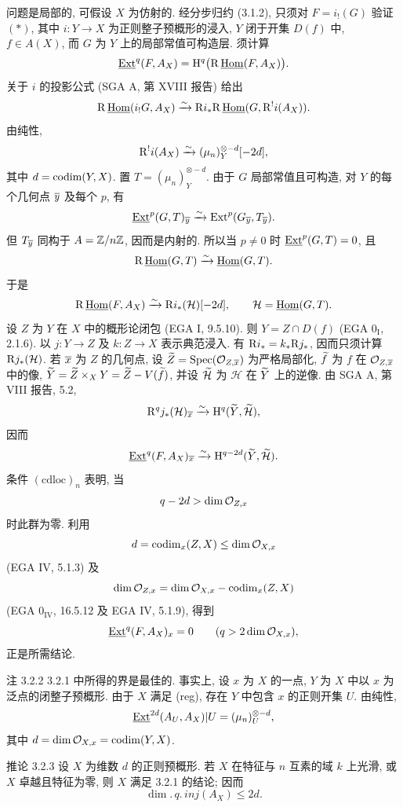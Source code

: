 \begin{prooftext}
问题是局部的, 可假设 $X$ 为仿射的. 经分步归约 (3.1.2), 只须对 $F=i_!(G)$ 验证 $(*)$, 其中 $i:Y\to X$ 为正则整子预概形的浸入, $Y$ 闭于开集 $D(f)$ 中, $f\in A(X)$, 而 $G$ 为 $Y$ 上的局部常值可构造层. 须计算
\[
   \underline{\operatorname{Ext}}^q(F,A_X)=\mathrm{H}^q\bigl(\mathrm R\,\underline{\operatorname{Hom}}(F,A_X)\bigr).
\]
关于 $i$ 的投影公式 (SGA A, 第 XVIII 报告) 给出
\[
 \mathrm R\,\underline{\operatorname{Hom}}(i_!G,A_X)
   \xrightarrow{\sim}
 \mathrm R i_*\mathrm R\,\underline{\operatorname{Hom}}(G,\mathrm R^!i(A_X)).
\]
由纯性,
\[
   \mathrm R^!i(A_X)\xrightarrow{\sim}(\mu_n)^{\otimes -d}_Y[-2d],
\]
其中 $d=\operatorname{codim}(Y,X)$. 置 $T=(\mu_n)^{\otimes -d}_Y$. 由于 $G$ 局部常值且可构造, 对 $Y$ 的每个几何点 $\overline{y}$ 及每个 $p$, 有
\[
   \underline{\operatorname{Ext}}^p(G,T)_{\overline{y}}\xrightarrow{\sim}\operatorname{Ext}^p(G_{\overline{y}},T_{\overline{y}}).
\]
但 $T_{\overline{y}}$ 同构于 $A=\mathbb{Z}/n\mathbb{Z}$, 因而是内射的. 所以当 $p\ne0$ 时 $\underline{\operatorname{Ext}}^p(G,T)=0$, 且
\[
   \mathrm R\,\underline{\operatorname{Hom}}(G,T)\xrightarrow{\sim}\underline{\operatorname{Hom}}(G,T).
\]
于是
\[
   \mathrm R\,\underline{\operatorname{Hom}}(F,A_X)
      \xrightarrow{\sim} \mathrm R i_*(\mathcal H)[-2d],
   \qquad \mathcal H=\underline{\operatorname{Hom}}(G,T).
\]
设 $Z$ 为 $Y$ 在 $X$ 中的概形论闭包 (EGA I, 9.5.10). 则 $Y=Z\cap D(f)$ (EGA $0_{\mathrm I}$, 2.1.6). 以 $j:Y\to Z$ 及 $k:Z\to X$ 表示典范浸入. 有 $\mathrm R i_*=k_*\mathrm R j_*$, 因而只须计算 $\mathrm R j_*(\mathcal H)$. 若 $\overline{x}$ 为 $Z$ 的几何点, 设 $\widetilde{Z}=\operatorname{Spec}(\mathcal{O}_{Z,\overline{x}})$ 为严格局部化, $\widetilde{f}$ 为 $f$ 在 $\mathcal{O}_{Z,\overline{x}}$ 中的像, $\widetilde{Y}=\widetilde{Z}\times_XY=\widetilde{Z}-V(\widetilde{f})$, 并设 $\widetilde{\mathcal H}$ 为 $\mathcal H$ 在 $\widetilde{Y}$ 上的逆像. 由 SGA A, 第 VIII 报告, 5.2,
\[
   \mathrm R^qj_*(\mathcal H)_{\overline{x}}
      \xrightarrow{\sim}\mathrm{H}^q(\widetilde{Y},\widetilde{\mathcal H}),
\]
因而
\[
   \underline{\operatorname{Ext}}^q(F,A_X)_{\overline{x}}
      \xrightarrow{\sim}\mathrm{H}^{q-2d}(\widetilde{Y},\widetilde{\mathcal H}).
\]
条件 $(\mathrm{cdloc})_n$ 表明, 当
\[
   q-2d>\dim\mathcal{O}_{Z,x}
\]
时此群为零. 利用
\[
   d=\operatorname{codim}_x(Z,X)\le\dim\mathcal{O}_{X,x}
\]
(EGA IV, 5.1.3) 及
\[
   \dim\mathcal{O}_{Z,x}
     =\dim\mathcal{O}_{X,x}-\operatorname{codim}_x(Z,X)
\]
(EGA $0_{\mathrm{IV}}$, 16.5.12 及 EGA IV, 5.1.9), 得到
\[
   \underline{\operatorname{Ext}}^q(F,A_X)_x=0\qquad(q>2\dim\mathcal{O}_{X,x}),
\]
正是所需结论. \qedtext
\end{prooftext}

\begin{statement}{注 3.2.2}
3.2.1 中所得的界是最佳的. 事实上, 设 $x$ 为 $X$ 的一点, $Y$ 为 $X$ 中以 $x$ 为泛点的闭整子预概形. 由于 $X$ 满足 (reg), 存在 $Y$ 中包含 $x$ 的正则开集 $U$. 由纯性,
\[
   \underline{\operatorname{Ext}}^{2d}(A_U,A_X)|U=(\mu_n)^{\otimes -d}_U,
\]
其中 $d=\dim\mathcal{O}_{X,x}=\operatorname{codim}(Y,X)$.
\end{statement}

\begin{statement}{推论 3.2.3}
设 $X$ 为维数 $d$ 的正则预概形. 若 $X$ 在特征与 $n$ 互素的域 $k$ 上光滑, 或 $X$ 卓越且特征为零, 则 $X$ 满足 3.2.1 的结论; 因而
\[
   \dim.\,q.\,inj(A_X)\le 2d.
\]
\end{statement}

